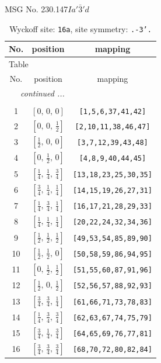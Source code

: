 \documentclass[fleqn,8pt]{jsarticle}
\begin{document}
\setcounter{MaxMatrixCols}{32}

\renewcommand{\tablename}{Table~}
\renewcommand{\figurename}{Figure~}
\begin{center}
\LARGE
MSG No. 230.147\quad$Ia'\bar{3}'d$
\end{center}
\renewcommand{\arraystretch}{1.2}
\begin{longtable}{ccc}
\caption{Wyckoff site: {\tt 16a}, site symmetry: {\tt .-3'.}}
 \\
 \hline \hline
No. & position & mapping \\ \hline \endfirsthead

\multicolumn{2}{l}{\tablename\ \thetable{}} \\
 \hline \hline
No. & position & mapping \\ \hline \endhead

 \hline \hline
\multicolumn{2}{r}{\footnotesize\it continued ...} \\ \endfoot

 \hline \hline
\multicolumn{2}{r}{} \\ \endlastfoot

1 & $\left[ 0,\, 0,\, 0 \right]$ & {\tt [1,5,6,37,41,42]} \\ \hline
2 & $\left[ 0,\, 0,\, \frac{1}{2} \right]$ & {\tt [2,10,11,38,46,47]} \\ \hline
3 & $\left[ \frac{1}{2},\, 0,\, 0 \right]$ & {\tt [3,7,12,39,43,48]} \\ \hline
4 & $\left[ 0,\, \frac{1}{2},\, 0 \right]$ & {\tt [4,8,9,40,44,45]} \\ \hline
5 & $\left[ \frac{1}{4},\, \frac{1}{4},\, \frac{3}{4} \right]$ & {\tt [13,18,23,25,30,35]} \\ \hline
6 & $\left[ \frac{3}{4},\, \frac{1}{4},\, \frac{1}{4} \right]$ & {\tt [14,15,19,26,27,31]} \\ \hline
7 & $\left[ \frac{1}{4},\, \frac{3}{4},\, \frac{1}{4} \right]$ & {\tt [16,17,21,28,29,33]} \\ \hline
8 & $\left[ \frac{1}{4},\, \frac{1}{4},\, \frac{1}{4} \right]$ & {\tt [20,22,24,32,34,36]} \\ \hline
9 & $\left[ \frac{1}{2},\, \frac{1}{2},\, \frac{1}{2} \right]$ & {\tt [49,53,54,85,89,90]} \\ \hline
10 & $\left[ \frac{1}{2},\, \frac{1}{2},\, 0 \right]$ & {\tt [50,58,59,86,94,95]} \\ \hline
11 & $\left[ 0,\, \frac{1}{2},\, \frac{1}{2} \right]$ & {\tt [51,55,60,87,91,96]} \\ \hline
12 & $\left[ \frac{1}{2},\, 0,\, \frac{1}{2} \right]$ & {\tt [52,56,57,88,92,93]} \\ \hline
13 & $\left[ \frac{3}{4},\, \frac{3}{4},\, \frac{1}{4} \right]$ & {\tt [61,66,71,73,78,83]} \\ \hline
14 & $\left[ \frac{1}{4},\, \frac{3}{4},\, \frac{3}{4} \right]$ & {\tt [62,63,67,74,75,79]} \\ \hline
15 & $\left[ \frac{3}{4},\, \frac{1}{4},\, \frac{3}{4} \right]$ & {\tt [64,65,69,76,77,81]} \\ \hline
16 & $\left[ \frac{3}{4},\, \frac{3}{4},\, \frac{3}{4} \right]$ & {\tt [68,70,72,80,82,84]} \\
\end{longtable}
\end{document}
